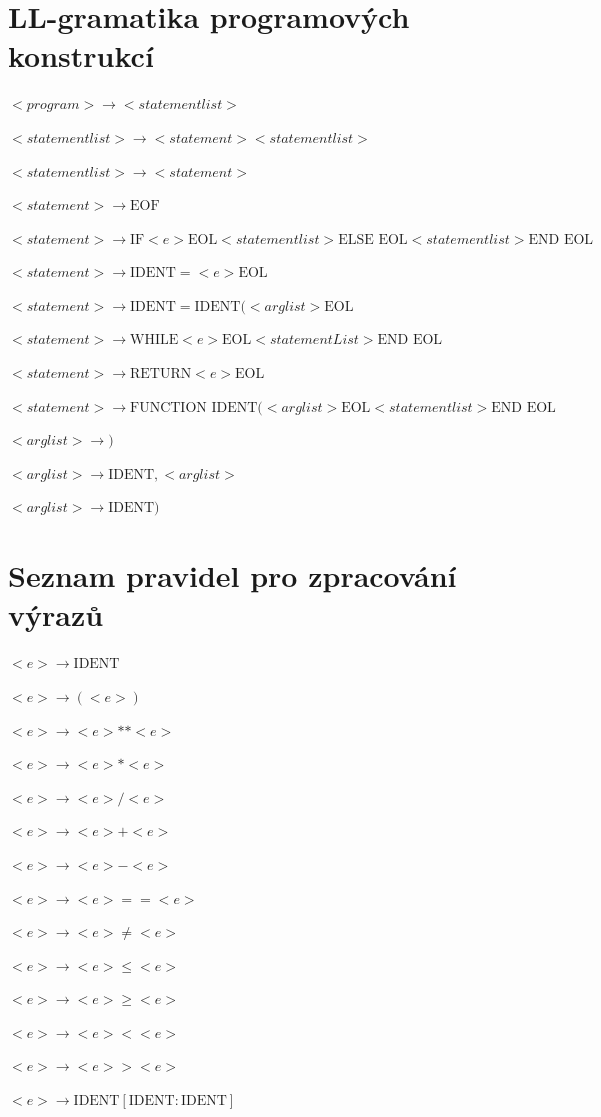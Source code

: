 \documentclass[a4paper, 12pt]{article}[5.12.2012]
\begin{document}
\section{LL-gramatika programových konstrukcí}
\begin{enumerate}
{\footnotesize
  \item $<program>\rightarrow<statementlist>$
  \item $<statementlist>\rightarrow<statement> <statementlist>$
  \item $<statementlist>\rightarrow<statement>$
  \item $<statement>\rightarrow \text{EOF}$
  \item $<statement>\rightarrow \text{IF} <e> \text{EOL} <statementlist> \text{ELSE EOL} <statementlist> \text{END EOL}$
  \item $<statement>\rightarrow \text{IDENT} = <e> \text{EOL}$
  \item $<statement>\rightarrow \text{IDENT} = \text{IDENT}( <arglist> \text{EOL}$
  \item $<statement>\rightarrow \text{WHILE} <e> \text{EOL} <statementList> \text{END EOL}$
  \item $<statement>\rightarrow \text{RETURN} <e> \text{EOL}$
  \item $<statement>\rightarrow \text{FUNCTION IDENT} ( <arglist> \text{EOL} <statementlist> \text{END EOL}$
  \item $<arglist>\rightarrow )$
  \item $<arglist>\rightarrow \text{IDENT} , <arglist>$
  \item $<arglist>\rightarrow \text{IDENT} )$
}
\end{enumerate}

\section{Seznam pravidel pro zpracování výrazů}
\begin{enumerate}
{\footnotesize
  \item $<e>\rightarrow \text{IDENT}$
  \item $<e>\rightarrow ( <e> )$
  \item $<e>\rightarrow<e> ** <e>$
  \item $<e>\rightarrow<e> * <e>$
  \item $<e>\rightarrow<e> / <e>$
  \item $<e>\rightarrow<e> +<e>$
  \item $<e>\rightarrow<e> -<e>$
  \item $<e>\rightarrow<e> == <e>$
  \item $<e>\rightarrow<e> \neq <e>$
  \item $<e>\rightarrow<e> \leq <e>$
  \item $<e>\rightarrow<e> \geq <e>$
  \item $<e>\rightarrow<e> < <e>$
  \item $<e>\rightarrow<e> > <e>$
  \item $<e>\rightarrow \text{IDENT} [ \text{IDENT} : \text{IDENT} ]$
}
\end{enumerate}
\end{document}

